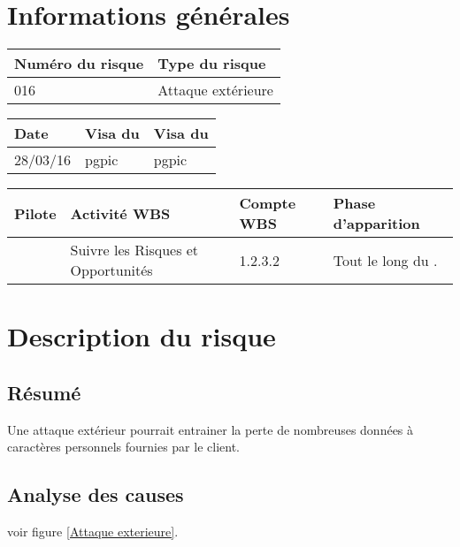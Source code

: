 
\section*{Informations générales}

\begin{table}[H]
\centering
	\begin{tabularx}{16.8cm}{|X|X|}
	\hline
	\rowcolor{gray!40} Numéro du risque & Type du risque \\
	\hline
	016 & Attaque extérieure \\
	\hline
	\end{tabularx}
\end{table}

\begin{table}[H]
\centering
	\begin{tabularx}{16.8cm}{|X|X|X|}
	\hline
	\rowcolor{gray!40} Date & Visa du \RQ & Visa du \CP \\
	\hline
	 28/03/16 & pgpic & pgpic \\
	\hline
	\end{tabularx}
\end{table}

\begin{table}[H]
\centering
	\begin{tabularx}{16.8cm}{|X|X|X|X|}
	\hline
	\rowcolor{gray!40} Pilote & Activité WBS & Compte WBS & Phase d'apparition \\
	\hline
	 \Florian & Suivre les Risques et Opportunités & 1.2.3.2 & Tout le long du \PICCourt. \\
	\hline
	\end{tabularx}
\end{table}

\section*{Description du risque}

\subsection*{Résumé}
	Une attaque extérieur pourrait entrainer la perte de nombreuses données à caractères personnels fournies par le client. 
	
\subsection*{Analyse des causes}
	voir figure \ref{Attaque exterieure}.

